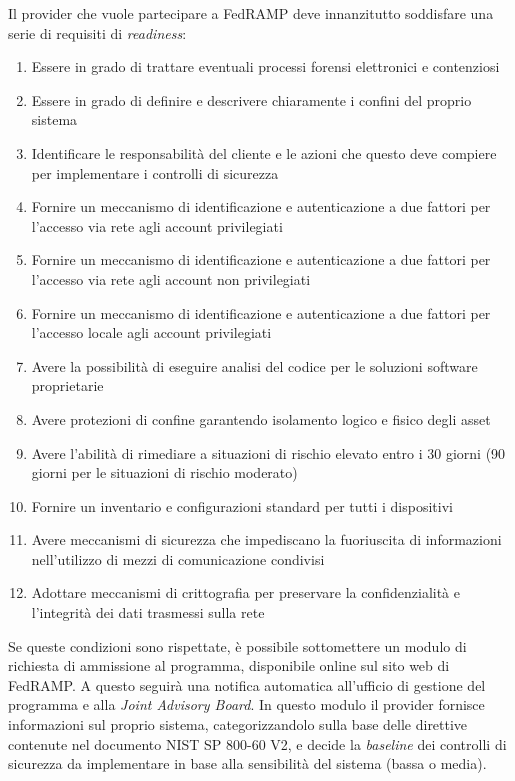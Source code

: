 \documentclass[../main.tex]{subfiles}
\begin{document}
Il provider che vuole partecipare a FedRAMP deve innanzitutto soddisfare una serie di requisiti di \textit{readiness}:
\begin{enumerate}
    \item Essere in grado di trattare eventuali processi forensi elettronici e contenziosi 
    \item Essere in grado di definire e descrivere chiaramente i confini del proprio sistema
    \item Identificare le responsabilità del cliente e le azioni che questo deve compiere per implementare i controlli di sicurezza
    \item Fornire un meccanismo di identificazione e autenticazione a due fattori per l'accesso via rete agli account privilegiati
    \item Fornire un meccanismo di identificazione e autenticazione a due fattori per l'accesso via rete agli account non privilegiati
    \item Fornire un meccanismo di identificazione e autenticazione a due fattori per l'accesso locale agli account privilegiati
    \item Avere la possibilità di eseguire analisi del codice per le soluzioni software proprietarie
    \item Avere protezioni di confine garantendo isolamento logico e fisico degli asset
    \item Avere l'abilità di rimediare a situazioni di rischio elevato entro i 30 giorni (90 giorni per le situazioni di rischio moderato)
    \item Fornire un inventario e configurazioni standard per tutti i dispositivi
    \item Avere meccanismi di sicurezza che impediscano la fuoriuscita di informazioni nell'utilizzo di mezzi di comunicazione condivisi
    \item Adottare meccanismi di crittografia per preservare la confidenzialità e l'integrità dei dati trasmessi sulla rete
\end{enumerate}


Se queste condizioni sono rispettate, è possibile sottomettere un modulo di richiesta di ammissione al programma, disponibile online sul sito web di FedRAMP. A questo seguirà una notifica automatica all'ufficio di gestione del programma e alla \textit{Joint Advisory Board}.
In questo modulo il provider fornisce informazioni sul proprio sistema, categorizzandolo sulla base delle direttive contenute nel documento NIST SP 800-60 V2, e decide la \textit{baseline} dei controlli di sicurezza da implementare in base alla sensibilità del sistema (bassa o media).
\end{document}
